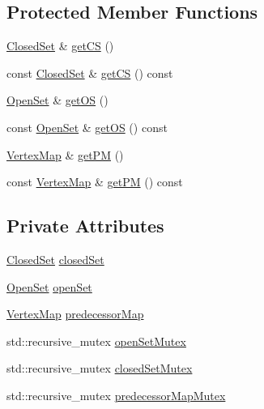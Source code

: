 \subsection*{Protected Member Functions}
\begin{DoxyCompactItemize}
\item 
\hyperlink{namespace_path_algorithm_ac027c23e4b4c237b6eb96fc63d79266f}{Closed\+Set} \& \hyperlink{class_path_algorithm_1_1_a_star_a4cb2a6c928a01fcac02533500bd8ace5}{get\+CS} ()
\item 
const \hyperlink{namespace_path_algorithm_ac027c23e4b4c237b6eb96fc63d79266f}{Closed\+Set} \& \hyperlink{class_path_algorithm_1_1_a_star_a420e1ac8824a265dc2272c7e50899322}{get\+CS} () const 
\item 
\hyperlink{namespace_path_algorithm_a999fc5baea7d1f71e42570630a297029}{Open\+Set} \& \hyperlink{class_path_algorithm_1_1_a_star_a48e23107ffca02392bdf2439775baecf}{get\+OS} ()
\item 
const \hyperlink{namespace_path_algorithm_a999fc5baea7d1f71e42570630a297029}{Open\+Set} \& \hyperlink{class_path_algorithm_1_1_a_star_af5ea4271f9318edaa68d8030e35d0cf1}{get\+OS} () const 
\item 
\hyperlink{namespace_path_algorithm_ac8a52a9740a0bfa959810bd92e08d962}{Vertex\+Map} \& \hyperlink{class_path_algorithm_1_1_a_star_a4bb6718fd07f503ff836c5cdccd74236}{get\+PM} ()
\item 
const \hyperlink{namespace_path_algorithm_ac8a52a9740a0bfa959810bd92e08d962}{Vertex\+Map} \& \hyperlink{class_path_algorithm_1_1_a_star_a021ff514f018ce9ec7db705578a210d4}{get\+PM} () const 
\end{DoxyCompactItemize}
\subsection*{Private Attributes}
\begin{DoxyCompactItemize}
\item 
\hyperlink{namespace_path_algorithm_ac027c23e4b4c237b6eb96fc63d79266f}{Closed\+Set} \hyperlink{class_path_algorithm_1_1_a_star_ac30f7714d07594a6b75516daa0a26da7}{closed\+Set}
\item 
\hyperlink{namespace_path_algorithm_a999fc5baea7d1f71e42570630a297029}{Open\+Set} \hyperlink{class_path_algorithm_1_1_a_star_a51ac9d9ef516c2317c2c77a919b64532}{open\+Set}
\item 
\hyperlink{namespace_path_algorithm_ac8a52a9740a0bfa959810bd92e08d962}{Vertex\+Map} \hyperlink{class_path_algorithm_1_1_a_star_a0fb8d0d9ad9822987926c815c9d4353d}{predecessor\+Map}
\item 
std\+::recursive\+\_\+mutex \hyperlink{class_path_algorithm_1_1_a_star_a2352488a734c820b77410b1ed7914a49}{open\+Set\+Mutex}
\item 
std\+::recursive\+\_\+mutex \hyperlink{class_path_algorithm_1_1_a_star_a1c8d2da0af60b0857bfd0abd3fa057ac}{closed\+Set\+Mutex}
\item 
std\+::recursive\+\_\+mutex \hyperlink{class_path_algorithm_1_1_a_star_ac69b08a85dfe16b7571b33fb9231f9c1}{predecessor\+Map\+Mutex}
\end{DoxyCompactItemize}


